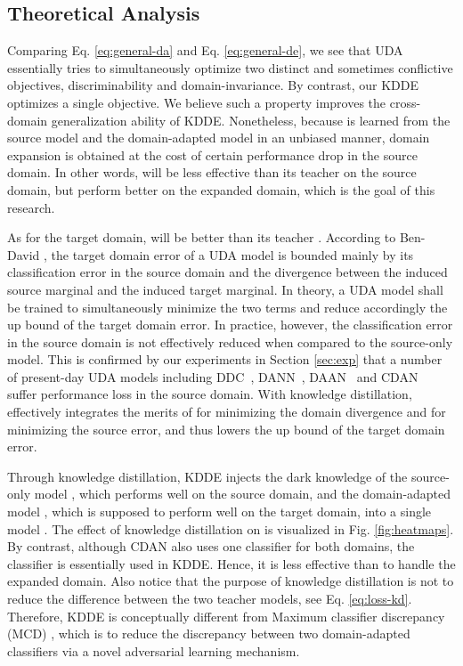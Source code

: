 \subsection{Theoretical Analysis}

Comparing Eq. \ref{eq:general-da} and Eq. \ref{eq:general-de}, we see that UDA essentially tries to simultaneously optimize two distinct and sometimes conflictive objectives, \ie discriminability and domain-invariance. By contrast, our KDDE optimizes a single objective. We believe such a property improves the cross-domain generalization ability of KDDE. Nonetheless, because  is learned from the source model  and the domain-adapted model  in an unbiased manner, domain expansion is obtained at the cost of certain performance drop in the source domain. In other words,  will be less effective than its teacher  on the source domain, but perform better on the expanded domain, which is the goal of this research.

As for the target domain,  will be better than its teacher . According to Ben-David \etal \cite{ben2007analysis}, the target domain error of a UDA model is bounded mainly by its classification error in the source domain and the divergence between the induced source marginal and the induced target marginal. In theory, a UDA model shall be trained to simultaneously minimize the two terms and reduce accordingly the up bound of the target domain error. In practice, however, the classification error in the source domain is not effectively reduced when compared to the source-only model. This is confirmed by our experiments in Section \ref{sec:exp} that a number of present-day UDA models including DDC~\cite{ddc}, DANN~\cite{jmlr16-dann}, DAAN~\cite{icdm19-daan} and CDAN~\cite{nips18-cdan} suffer performance loss in the source domain. With knowledge distillation,  effectively integrates the merits of  for minimizing the domain divergence and  for minimizing the source error, and thus lowers the up bound of the target domain error. 

Through knowledge distillation, KDDE injects the dark knowledge of the source-only model , which performs well on the source domain, and the domain-adapted model , which is supposed to perform well on the target domain, into a single model . The effect of knowledge distillation on  is visualized in Fig. \ref{fig:heatmaps}. By contrast, although CDAN also uses one classifier for both domains, the classifier is essentially  used in KDDE. Hence, it is less effective than  to handle the expanded domain. Also notice that the purpose of knowledge distillation is not to reduce the difference between the two teacher models, see Eq. \ref{eq:loss-kd}. Therefore, KDDE is conceptually different from Maximum classifier discrepancy (MCD) \cite{cvpr2018-mcd}, which is to reduce the discrepancy between two domain-adapted classifiers via a novel adversarial learning mechanism.


